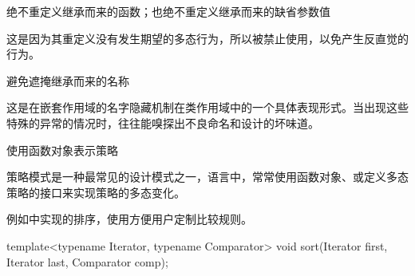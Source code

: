 \begin{content}
\begin{regulation}
绝不重定义继承而来的函数；也绝不重定义继承而来的缺省参数值
\end{regulation}

这是因为其重定义没有发生期望的多态行为，所以被禁止使用，以免产生反直觉的行为。

\begin{regulation}
避免遮掩继承而来的名称
\end{regulation}

这是在嵌套作用域的名字隐藏机制在类作用域中的一个具体表现形式。当出现这些特殊的异常的情况时，往往能嗅探出不良命名和设计的坏味道。

\begin{regulation}
使用函数对象表示策略
\end{regulation}

策略模式是一种最常见的设计模式之一，\cpp{}语言中，常常使用函数对象、或定义多态策略的接口来实现策略的多态变化。

例如中实现的排序，使用方便用户定制比较规则。

\begin{leftbar}
\begin{c++}
template<typename Iterator, typename Comparator>
void sort(Iterator first, Iterator last, Comparator comp);
\end{c++}
\end{leftbar}

\end{content}
